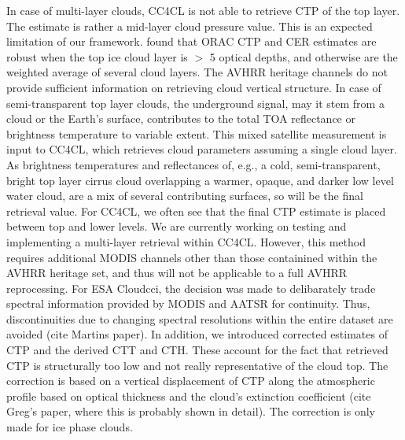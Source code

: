 In case of multi-layer clouds, CC4CL is not able to retrieve CTP of the top layer. The estimate is rather a mid-layer cloud pressure value. This is an expected limitation of our framework. \citet{Poulsen12} found that ORAC CTP and CER estimates are robust when the top ice cloud layer is $>$ 5 optical depths, and otherwise are the weighted average of several cloud layers. The AVHRR heritage channels do not provide sufficient information on retrieving cloud vertical structure. In case of semi-transparent top layer clouds, the underground signal, may it stem from a cloud or the Earth's surface, contributes to the total TOA reflectance or brightness temperature to variable extent. This mixed satellite measurement is input to CC4CL, which retrieves cloud parameters assuming a single cloud layer. As brightness temperatures and reflectances of, e.g., a cold, semi-transparent, bright top layer cirrus cloud overlapping a warmer, opaque, and darker low level water cloud, are a mix of several contributing surfaces, so will be the final retrieval value. For CC4CL, we often see that the final CTP estimate is placed between top and lower levels. We are currently working on testing and implementing a multi-layer retrieval within CC4CL. However, this method requires additional MODIS channels other than those containined within the AVHRR heritage set, and thus will not be applicable to a full AVHRR reprocessing. For ESA Cloud\textunderscore cci, the decision was made to delibarately trade spectral information provided by MODIS and AATSR for continuity. Thus, discontinuities due to changing spectral resolutions within the entire dataset are avoided (cite Martins paper). In addition, we introduced corrected estimates of CTP and the derived CTT and CTH. These account for the fact that retrieved CTP is structurally too low and not really representative of the cloud top. The correction is based on a vertical displacement of CTP along the atmospheric profile based on optical thickness and the cloud's extinction coefficient (cite Greg's paper, where this is probably shown in detail). The correction is only made for ice phase clouds.

